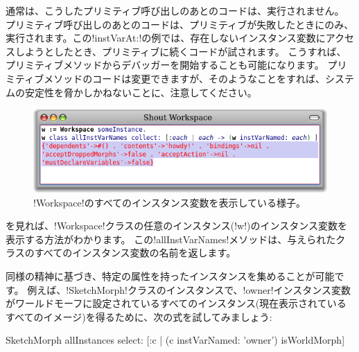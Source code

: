 \documentclass[a4paper,10pt,twoside]{book}
\begin{document}
通常は、こうしたプリミティブ呼び出しのあとのコードは、実行されません。
プリミティブ呼び出しのあとのコードは、プリミティブが失敗したときにのみ、実行されます。この\ct!instVarAt:!の例では、存在しないインスタンス変数にアクセスしようとしたとき、プリミティブに続くコードが試されます。
こうすれば、プリミティブメソッドからデバッガーを開始することも可能になります。
プリミティブメソッドのコードは変更できますが、そのようなことをすれば、\pharo{}システムの安定性を脅かしかねないことに、注意してください。%

\begin{figure}[ht]\centering
	\includegraphics[width=\linewidth]{allInstanceVariables}
	\caption{\ct!Workspace!のすべてのインスタンス変数を表示している様子。}
\end{figure}

を見れば、\ct!Workspace!クラスの任意のインスタンス(\ct!w!)のインスタンス変数を表示する方法がわかります。
この\ct!allInstVarNames!メソッドは、与えられたクラスのすべてのインスタンス変数の名前を返します。

同様の精神に基づき、特定の属性を持ったインスタンスを集めることが可能です。%
例えば、\ct!SketchMorph!クラスのインスタンスで、\ct!owner!インスタンス変数がワールドモーフに設定されているすべてのインスタンス(\ie 現在表示されているすべてのイメージ)を得るために、次の式を試してみましょう:
\begin{code}{}
SketchMorph allInstances select: [:c | (c instVarNamed: 'owner') isWorldMorph]
\end{code}
\end{document}
